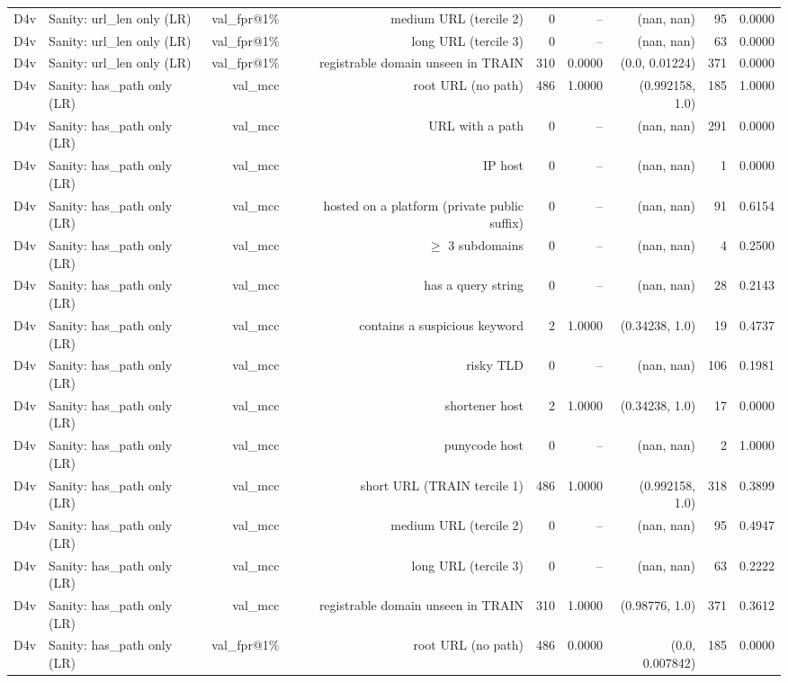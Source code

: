 \begin{table}[t]
\begin{tabular}{llrrrrrrr}
D4v & Sanity: url\_len only (LR) & val\_fpr@1\% & medium URL (tercile 2) & 0 & -- & (nan, nan) & 95 & 0.0000 \\
D4v & Sanity: url\_len only (LR) & val\_fpr@1\% & long URL (tercile 3) & 0 & -- & (nan, nan) & 63 & 0.0000 \\
D4v & Sanity: url\_len only (LR) & val\_fpr@1\% & registrable domain unseen in TRAIN & 310 & 0.0000 & (0.0, 0.01224) & 371 & 0.0000 \\
D4v & Sanity: has\_path only (LR) & val\_mcc & root URL (no path) & 486 & 1.0000 & (0.992158, 1.0) & 185 & 1.0000 \\
D4v & Sanity: has\_path only (LR) & val\_mcc & URL with a path & 0 & -- & (nan, nan) & 291 & 0.0000 \\
D4v & Sanity: has\_path only (LR) & val\_mcc & IP host & 0 & -- & (nan, nan) & 1 & 0.0000 \\
D4v & Sanity: has\_path only (LR) & val\_mcc & hosted on a platform (private public suffix) & 0 & -- & (nan, nan) & 91 & 0.6154 \\
D4v & Sanity: has\_path only (LR) & val\_mcc & $\geq$ 3 subdomains & 0 & -- & (nan, nan) & 4 & 0.2500 \\
D4v & Sanity: has\_path only (LR) & val\_mcc & has a query string & 0 & -- & (nan, nan) & 28 & 0.2143 \\
D4v & Sanity: has\_path only (LR) & val\_mcc & contains a suspicious keyword & 2 & 1.0000 & (0.34238, 1.0) & 19 & 0.4737 \\
D4v & Sanity: has\_path only (LR) & val\_mcc & risky TLD & 0 & -- & (nan, nan) & 106 & 0.1981 \\
D4v & Sanity: has\_path only (LR) & val\_mcc & shortener host & 2 & 1.0000 & (0.34238, 1.0) & 17 & 0.0000 \\
D4v & Sanity: has\_path only (LR) & val\_mcc & punycode host & 0 & -- & (nan, nan) & 2 & 1.0000 \\
D4v & Sanity: has\_path only (LR) & val\_mcc & short URL (TRAIN tercile 1) & 486 & 1.0000 & (0.992158, 1.0) & 318 & 0.3899 \\
D4v & Sanity: has\_path only (LR) & val\_mcc & medium URL (tercile 2) & 0 & -- & (nan, nan) & 95 & 0.4947 \\
D4v & Sanity: has\_path only (LR) & val\_mcc & long URL (tercile 3) & 0 & -- & (nan, nan) & 63 & 0.2222 \\
D4v & Sanity: has\_path only (LR) & val\_mcc & registrable domain unseen in TRAIN & 310 & 1.0000 & (0.98776, 1.0) & 371 & 0.3612 \\
D4v & Sanity: has\_path only (LR) & val\_fpr@1\% & root URL (no path) & 486 & 0.0000 & (0.0, 0.007842) & 185 & 0.0000 \\

\end{tabular}
\end{table}
